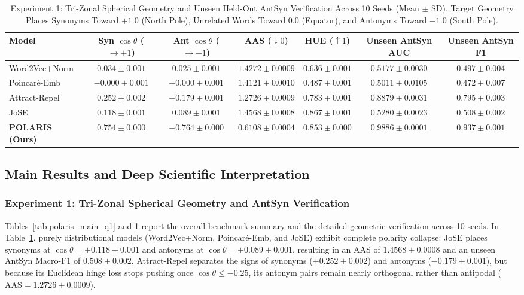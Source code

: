 \documentclass[journal]{IEEEtran}
\begin{document}
\begin{table}[!t]
\centering
\caption{Experiment 1: Tri-Zonal Spherical Geometry and Unseen Held-Out AntSyn Verification Across 10 Seeds (Mean $\pm$ SD). Target Geometry Places Synonyms Toward $+1.0$ (North Pole), Unrelated Words Toward $0.0$ (Equator), and Antonyms Toward $-1.0$ (South Pole).}
\label{tab:exp1_geometry}
\begin{tabular}{lcccccc}
\toprule
\textbf{Model} & \textbf{Syn $\cos\theta$ ($\to +1$)} & \textbf{Ant $\cos\theta$ ($\to -1$)} & \textbf{AAS ($\downarrow 0$)} & \textbf{HUE ($\uparrow 1$)} & \textbf{Unseen AntSyn AUC} & \textbf{Unseen AntSyn F1} \\
\midrule
Word2Vec+Norm \cite{mikolov2013distributed} & $0.034 \pm 0.001$ & $0.025 \pm 0.001$ & $1.4272 \pm 0.0009$ & $0.636 \pm 0.001$ & $0.5177 \pm 0.0030$ & $0.497 \pm 0.004$ \\
Poincar\'{e}-Emb \cite{nickel2017poincare} & $-0.000 \pm 0.001$ & $-0.000 \pm 0.001$ & $1.4121 \pm 0.0010$ & $0.487 \pm 0.001$ & $0.5011 \pm 0.0105$ & $0.472 \pm 0.007$ \\
Attract-Repel \cite{mrksic2017semantic} & $0.252 \pm 0.002$ & $-0.179 \pm 0.001$ & $1.2726 \pm 0.0009$ & $0.783 \pm 0.001$ & $0.8879 \pm 0.0031$ & $0.795 \pm 0.003$ \\
JoSE \cite{meng2019spherical} & $0.118 \pm 0.001$ & $0.089 \pm 0.001$ & $1.4568 \pm 0.0008$ & $\mathbf{0.867 \pm 0.001}$ & $0.5280 \pm 0.0023$ & $0.508 \pm 0.002$ \\
\textbf{POLARIS (Ours)} & $\mathbf{0.754 \pm 0.000}$ & $\mathbf{-0.764 \pm 0.000}$ & $\mathbf{0.6108 \pm 0.0004}$ & $0.853 \pm 0.000$ & $\mathbf{0.9886 \pm 0.0001}$ & $\mathbf{0.937 \pm 0.001}$ \\
\bottomrule
\end{tabular}
\end{table}

\subsection{Main Results and Deep Scientific Interpretation}

\subsubsection{Experiment 1: Tri-Zonal Spherical Geometry and AntSyn Verification}
Tables~\ref{tab:polaris_main_q1} and \ref{tab:exp1_geometry} report the overall benchmark summary and the detailed geometric verification across 10 seeds. In Table~\ref{tab:exp1_geometry}, purely distributional models (Word2Vec+Norm, Poincar\'{e}-Emb, and JoSE) exhibit complete polarity collapse: JoSE places synonyms at $\cos\theta = +0.118 \pm 0.001$ and antonyms at $\cos\theta = +0.089 \pm 0.001$, resulting in an AAS of $1.4568 \pm 0.0008$ and an unseen AntSyn Macro-F1 of $0.508 \pm 0.002$. Attract-Repel separates the signs of synonyms ($+0.252 \pm 0.002$) and antonyms ($-0.179 \pm 0.001$), but because its Euclidean hinge loss stops pushing once $\cos\theta \le -0.25$, its antonym pairs remain nearly orthogonal rather than antipodal ($\text{AAS} = 1.2726 \pm 0.0009$).
\end{document}
